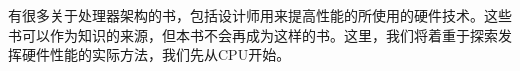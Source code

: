 有很多关于处理器架构的书，包括设计师用来提高性能的所使用的硬件技术。这些书可以作为知识的来源，但本书不会再成为这样的书。这里，我们将着重于探索发挥硬件性能的实际方法，我们先从CPU开始。













































